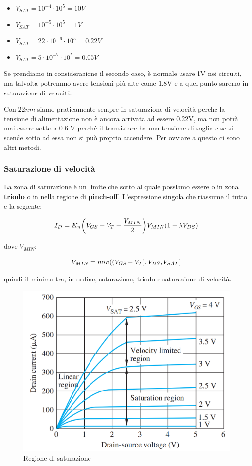 \begin{itemize}
    \item[] $V_{SAT} = 10^{-4}\cdot10^5 = 10 V$
    \item[] $V_{SAT} = 10^{-5}\cdot10^5 = 1 V$
    \item[] $V_{SAT} = 22\cdot10^{-6}\cdot10^5 = 0.22 V$
    \item[] $V_{SAT} = 5\cdot10^{-7}\cdot10^5 = 0.05 V$
\end{itemize}

Se prendiamo in considerazione il secondo caso, è normale usare 1V nei circuiti, ma talvolta potremmo avere tensioni più alte come 1.8V e a quel punto saremo in saturazione di velocità.

Con $22nm$ siamo praticamente sempre in saturazione di velocità perché la tensione di alimentazione non è ancora arrivata ad essere 0.22V, ma non potrà mai essere sotto a 0.6 V perché il transistore ha una tensione di soglia e se si scende sotto ad essa non si può proprio accendere. Per ovviare a questo ci sono altri metodi.


\subsubsection{Saturazione di velocità}
La zona di saturazione è un limite che sotto al quale possiamo essere o in zona \textbf{triodo} o in nella regione di \textbf{pinch-off}.
L'espressione singola che riassume il tutto e la segiente:

\begin{equation}
    I_D = K_n\biggl(V_{GS} - V_{T} -\frac{V_{MIN}}{2}\biggl)V_{MIN}(1-\lambda V_{DS})
\end{equation}

dove $V_{MIN}:$

\begin{equation*}
    V_{MIN} = min((V_{GS} - V_{T} ), V_{DS}, V_{SAT})
\end{equation*}

quindi il minimo tra, in ordine, saturazione, triodo e saturazione di velocità.

\begin{figure}[htbp]
    \centering
    \includegraphics[width=0.5\linewidth]{img/v_sat.png}
    \caption{Regione di saturazione}    
\end{figure}

